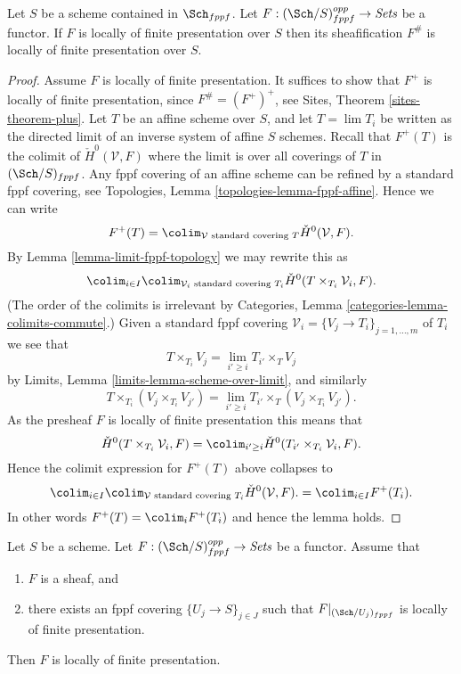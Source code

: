 \begin{lemma}
\label{lemma-sheafify-finite-presentation}
Let $S$ be a scheme contained in $\Sch_{fppf}$.
Let $F : (\Sch/S)_{fppf}^{opp} \to \textit{Sets}$ be a functor.
If $F$ is locally of finite presentation over $S$ then its sheafification
$F^\#$ is locally of finite presentation over $S$.
\end{lemma}

\begin{proof}
Assume $F$ is locally of finite presentation.
It suffices to show that $F^+$ is locally of finite presentation, since
$F^\# = (F^+)^+$, see
Sites, Theorem \ref{sites-theorem-plus}.
Let $T$ be an affine scheme over $S$, and let $T = \lim T_i$ be written
as the directed limit of an inverse system of affine $S$ schemes.
Recall that $F^+(T)$ is the colimit of $\check H^0(\mathcal{V}, F)$
where the limit is over all coverings of $T$ in $(\Sch/S)_{fppf}$.
Any fppf covering of an affine scheme can be refined by a standard
fppf covering, see
Topologies, Lemma \ref{topologies-lemma-fppf-affine}.
Hence we can write
$$
F^+(T)
=
\colim_{\mathcal{V}\text{ standard covering }T}
\check H^0(\mathcal{V}, F).
$$
By
Lemma \ref{lemma-limit-fppf-topology}
we may rewrite this as
$$
\colim_{i \in I}
\colim_{\mathcal{V}_i\text{ standard covering }T_i}
\check H^0(T \times_{T_i}\mathcal{V}_i, F).
$$
(The order of the colimits is irrelevant by
Categories, Lemma \ref{categories-lemma-colimits-commute}.)
Given a standard fppf covering
$\mathcal{V}_i = \{V_j \to T_i\}_{j = 1, \ldots, m}$ of $T_i$ we see that
$$
T \times_{T_i} V_j = \lim_{i' \geq i} T_{i'} \times_T V_j
$$
by
Limits, Lemma \ref{limits-lemma-scheme-over-limit}, and similarly
$$
T \times_{T_i} (V_j \times_{T_i} V_{j'}) =
\lim_{i' \geq i} T_{i'} \times_T (V_j \times_{T_i} V_{j'}).
$$
As the presheaf $F$ is locally of finite presentation this means that
$$
\check H^0(T \times_{T_i}\mathcal{V}_i, F)
=
\colim_{i' \geq i}
\check H^0(T_{i'} \times_{T_i}\mathcal{V}_i, F).
$$
Hence the colimit expression for $F^+(T)$ above collapses to
$$
\colim_{i \in I} \colim_{\mathcal{V}\text{ standard covering }T_i}
\check H^0(\mathcal{V}, F).
=
\colim_{i \in I} F^+(T_i).
$$
In other words $F^+(T) = \colim_i F^+(T_i)$ and hence
the lemma holds.
\end{proof}

\begin{lemma}
\label{lemma-sheaf-finite-presentation}
Let $S$ be a scheme.
Let $F : (\Sch/S)_{fppf}^{opp} \to \textit{Sets}$ be a functor.
Assume that
\begin{enumerate}
\item $F$ is a sheaf, and
\item there exists an fppf covering $\{U_j \to S\}_{j \in J}$ such that
$F|_{(\Sch/U_j)_{fppf}}$ is locally of finite presentation.
\end{enumerate}
Then $F$ is locally of finite presentation.
\end{lemma}

